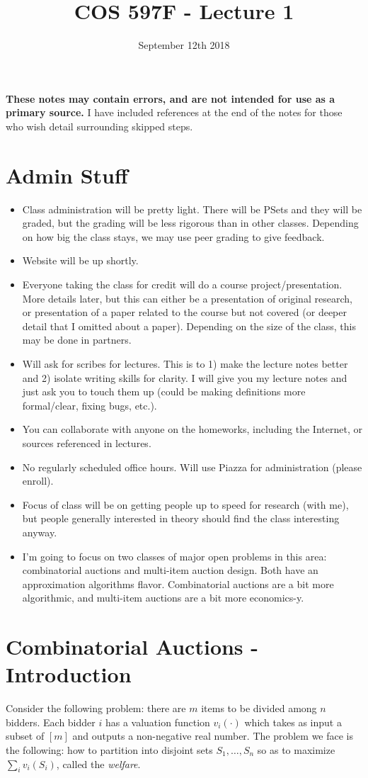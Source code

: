 \documentclass[12pt]{article}%
\newcommand{\disclaimer}{\textbf{These notes may contain errors, and are not intended for use as a primary source.} I have included references at the end of the notes for those who wish detail surrounding skipped steps.}
\begin{document}
\title{COS 597F - Lecture 1} 
\date{September 12th 2018}
\maketitle

\disclaimer
\section{Admin Stuff}
\begin{itemize}
\item Class administration will be pretty light. There will be PSets and they will be graded, but the grading will be less rigorous than in other classes. Depending on how big the class stays, we may use peer grading to give feedback.
\item Website will be up shortly.
\item Everyone taking the class for credit will do a course project/presentation. More details later, but this can either be a presentation of original research, or presentation of a paper related to the course but not covered (or deeper detail that I omitted about a paper). Depending on the size of the class, this may be done in partners.
\item Will ask for scribes for lectures. This is to 1) make the lecture notes better and 2) isolate writing skills for clarity. I will give you my lecture notes and just ask you to touch them up (could be making definitions more formal/clear, fixing bugs, etc.). 
\item You can collaborate with anyone on the homeworks, including the Internet, or sources referenced in lectures.
\item No regularly scheduled office hours. Will use Piazza for administration (please enroll). 
\item Focus of class will be on getting people up to speed for research (with me), but people generally interested in theory should find the class interesting anyway. 
\item I'm going to focus on two classes of major open problems in this area: combinatorial auctions and multi-item auction design. Both have an approximation algorithms flavor. Combinatorial auctions are a bit more algorithmic, and multi-item auctions are a bit more economics-y.
\end{itemize}

\section{Combinatorial Auctions - Introduction}
Consider the following problem: there are $m$ items to be divided among $n$ bidders. Each bidder $i$ has a valuation function $v_i(\cdot)$ which takes as input a subset of $[m]$ and outputs a non-negative real number. The problem we face is the following: how to partition into disjoint sets $S_1,\ldots, S_n$ so as to maximize $\sum_i v_i(S_i)$, called the \emph{welfare}. 
\end{document}
